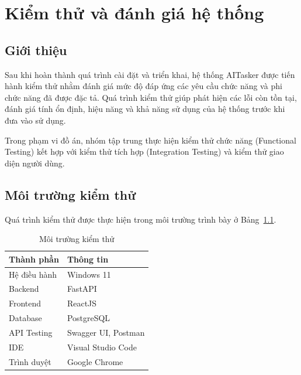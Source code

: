 \chapter{Kiểm thử và đánh giá hệ thống}

\section{Giới thiệu}

Sau khi hoàn thành quá trình cài đặt và triển khai, hệ thống AITasker được tiến
hành kiểm thử nhằm đánh giá mức độ đáp ứng các yêu cầu chức năng và phi chức
năng đã được đặc tả. Quá trình kiểm thử giúp phát hiện các lỗi còn tồn tại,
đánh giá tính ổn định, hiệu năng và khả năng sử dụng của hệ thống trước khi đưa
vào sử dụng.

Trong phạm vi đồ án, nhóm tập trung thực hiện kiểm thử chức năng (Functional
Testing) kết hợp với kiểm thử tích hợp (Integration Testing) và kiểm thử giao
diện người dùng.


\section{Môi trường kiểm thử}

Quá trình kiểm thử được thực hiện trong môi trường trình bày ở
Bảng~\ref{tab:test_environment}.

\begin{table}[H]
\centering
\caption{Môi trường kiểm thử}
\label{tab:test_environment}

\begin{tabular}{|p{6cm}|p{8cm}|}
\hline
\textbf{Thành phần} & \textbf{Thông tin} \\ \hline

Hệ điều hành & Windows 11 \\ \hline

Backend & FastAPI \\ \hline

Frontend & ReactJS \\ \hline

Database & PostgreSQL \\ \hline

API Testing & Swagger UI, Postman \\ \hline

IDE & Visual Studio Code \\ \hline

Trình duyệt & Google Chrome \\ \hline

\end{tabular}

\end{table}

